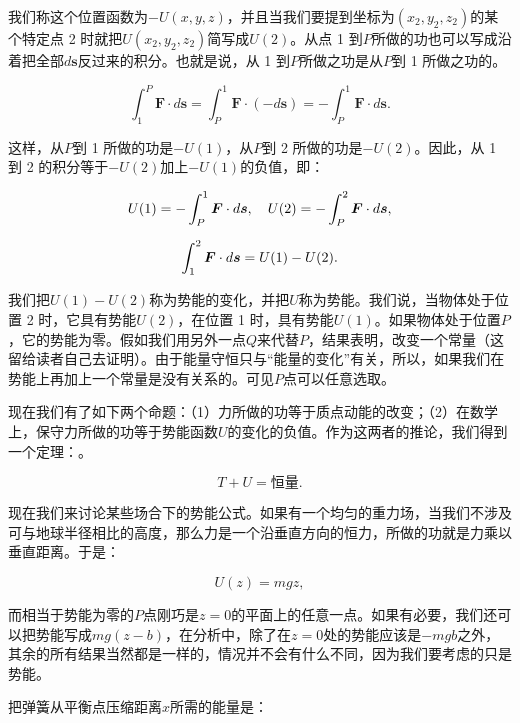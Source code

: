 \documentclass[12pt,oneside]{book}
\providecommand{\FLPvec}[1]{\boldsymbol{#1}}
\providecommand{\FLPF}[0]{\FLPvec{F}}
\providecommand{\FLPs}[0]{\FLPvec{s}}
\begin{document}
我们称这个位置函数为$-U(x,y,z)$，并且当我们要提到坐标为$(x_2,y_2,z_2)$的某个特定点 2 时就把$U(x_2,y_2,z_2)$简写成$U(2)$。从点 1 到$P$所做的功也可以写成沿着把全部$d\FLPs$反过来的积分。也就是说，从 1 到$P$所做之功是从$P$到 1 所做之功的。

\begin{equation*}
\int_1^P\FLPF\cdot d\FLPs=\int_P^1\FLPF\cdot(-d\FLPs)=
-\int_P^1\FLPF\cdot d\FLPs.
\end{equation*}

这样，从$P$到 1 所做的功是$-U(1)$，从$P$到 2 所做的功是$-U(2)$。因此，从 1 到 2 的积分等于$-U(2)$加上$-U(1)$的负值，即：


\begin{gather}
U(1)=-\int_P^1\FLPF\cdot d\FLPs,\quad
U(2)=-\int_P^2\FLPF\cdot d\FLPs,\notag\\[1.5ex]
\label{Eq:I:14:1}
\int_1^2\FLPF\cdot d\FLPs=U(1)-U(2).
\end{gather}


我们把$U(1) - U(2)$称为势能的变化，并把$U$称为势能。我们说，当物体处于位置 2 时，它具有势能$U(2)$，在位置 1 时，具有势能$U(1)$。如果物体处于位置$P$，它的势能为零。假如我们用另外一点$Q$来代替$P$，结果表明，改变一个常量（这留给读者自己去证明）。由于能量守恒只与“能量的变化”有关，所以，如果我们在势能上再加上一个常量是没有关系的。可见$P$点可以任意选取。


现在我们有了如下两个命题：（1）力所做的功等于质点动能的改变；（2）在数学上，保守力所做的功等于势能函数$U$的变化的负值。作为这两者的推论，我们得到一个定理：。


\begin{equation}
\label{Eq:I:14:2}
T+U=\text{恒量}.
\end{equation}

现在我们来讨论某些场合下的势能公式。如果有一个均匀的重力场，当我们不涉及可与地球半径相比的高度，那么力是一个沿垂直方向的恒力，所做的功就是力乘以垂直距离。于是：


\begin{equation}
\label{Eq:I:14:3}
U(z)=mgz,
\end{equation}

而相当于势能为零的$P$点刚巧是$z = 0$的平面上的任意一点。如果有必要，我们还可以把势能写成$mg(z - b)$，在分析中，除了在$z = 0$处的势能应该是$-mgb$之外，其余的所有结果当然都是一样的，情况并不会有什么不同，因为我们要考虑的只是势能。


把弹簧从平衡点压缩距离$x$所需的能量是：
\end{document}
